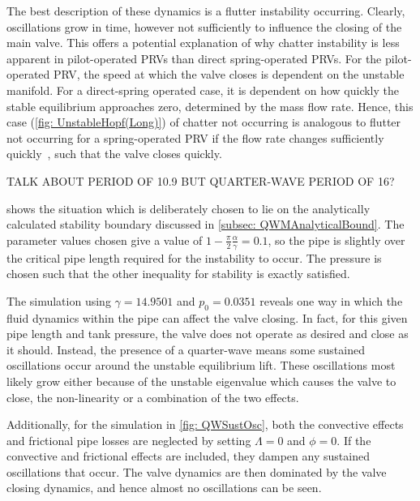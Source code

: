 \newpage
The best description of these dynamics is a flutter instability occurring. Clearly, oscillations grow in time, however not sufficiently to influence the closing of the main valve. This offers a potential explanation of why chatter instability is less apparent in pilot-operated PRVs than direct spring-operated PRVs.
For the pilot-operated PRV, the speed at which the valve closes is dependent on the unstable manifold. For a direct-spring operated case, it is dependent on how quickly the stable equilibrium approaches zero, determined by the mass flow rate.
Hence, this case (\cref{fig: UnstableHopf(Long)}) of chatter not occurring is analogous to flutter not occurring for a spring-operated PRV if the flow rate changes sufficiently quickly~\cite{Hos2017DynamicRecommendations}, such that the valve closes quickly.

TALK ABOUT PERIOD OF 10.9 BUT QUARTER-WAVE PERIOD OF 16?

 shows the situation which is deliberately chosen to lie on the analytically calculated stability boundary discussed in \cref{subsec: QWMAnalyticalBound}. The parameter values chosen give a value of $1 - \frac{\pi}{2} \frac{\alpha}{\gamma} = 0.1$, so the pipe is slightly over the critical pipe length required for the instability to occur. The pressure is chosen such that the other inequality for stability is exactly satisfied.
~


The simulation using $\gamma = 14.9501$ and $p_0 = 0.0351$ reveals one way in which the fluid dynamics within the pipe can affect the valve closing. In fact, for this given pipe length and tank pressure, the valve does not operate as desired and close as it should. Instead, the presence of a quarter-wave means some sustained oscillations occur around the unstable equilibrium lift. These oscillations most likely grow either because of the unstable eigenvalue which causes the valve to close, the non-linearity or a combination of the two effects.

Additionally, for the simulation in \cref{fig: QWSustOsc}, both the convective effects and frictional pipe losses are neglected by setting $\Lambda = 0$ and $\phi = 0$. If the convective and frictional effects are included, they dampen any sustained oscillations that occur. The valve dynamics are then dominated by the valve closing dynamics, and hence almost no oscillations can be seen.

